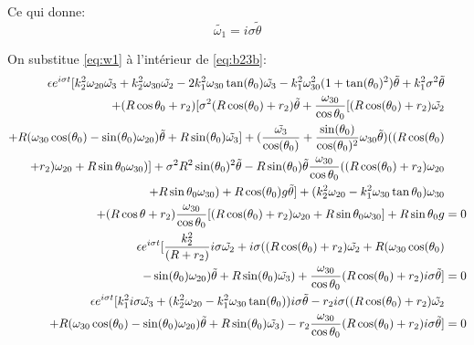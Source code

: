 Ce qui donne:
\begin{equation}
    \tilde{\omega_1}=i \sigma \tilde{\theta}
    \label{eq:w1}
\end{equation}

On substitue \ref{eq:w1} à l'intérieur de \ref{eq:b23b}:
\begin{align}
    \epsilon e^{i \sigma t} [k_2^2 \omega_{20} \tilde{\omega_3}+k_2^2 \omega_{30} \tilde{\omega_2} -2k_1^2\omega_{30} \tan(\theta_0)\tilde{\omega_3}-k_1^2 \omega_{30}^2(1+\tan(\theta_0)^2)\tilde{\theta} +k_1^2 \sigma^2 \tilde{\theta}& \nonumber \\
    +(R\cos{\theta_0}+r_2)[\sigma^2 ( R\cos(\theta_0)+r_2) \tilde{\theta}+\frac{\omega_{30}}{\cos{\theta_0}} [(R\cos(\theta_0)+r_2) \Tilde{\omega_2} & \nonumber \\
    +R(\omega_{30}\cos(\theta_0)-\sin(\theta_0)\omega_{20}) \Tilde{\theta}+R\sin(\theta_0) \Tilde{\omega_3} ] 
    + (\frac{\tilde{\omega_3}}{\cos(\theta_0)}+\frac{\sin(\theta_0)}{\cos(\theta_0)^2}\omega_{30}\tilde{\theta})((R\cos(\theta_0)& \nonumber \\
    +r_2)\omega_{20}+R \sin{\theta_0}\omega_{30})]+ \sigma^2 R^2 \sin(\theta_0)^2  \tilde{\theta}
    -R\sin(\theta_0)\tilde{\theta}\frac{\omega_{30}}{\cos{\theta_0}}  ((R\cos(\theta_0)+r_2)\omega_{20}& \nonumber \\
    +R \sin{\theta_0}\omega_{30})+R\cos(\theta_0)g\tilde{\theta}]+ (k_2^2\omega_{20}-k_1^2\omega_{30} \tan{\theta_0})\omega_{30}& \nonumber \\
    +(R\cos{\theta}+r_2)
     \frac{\omega_{30}}{\cos{\theta_0}}  [(R\cos(\theta_0)+r_2)\omega_{20}+R \sin{\theta_0}\omega_{30}]+ R\sin{\theta_0}g &=0 \nonumber\\ 
    \epsilon e^{i \sigma t}[\frac{k_2^2}{(R+r_2)} i \sigma \Tilde{\omega_2}+i \sigma((R\cos(\theta_0)+r_2) \Tilde{\omega_2} +R(\omega_{30}\cos(\theta_0)& \nonumber \\
    -\sin(\theta_0)\omega_{20}) \Tilde{\theta}+R\sin(\theta_0) \Tilde{\omega_3})+\frac{\omega_{30}}{\cos{\theta_0}} (R\cos(\theta_0)+r_2) i \sigma \tilde{\theta}]  &= 0 \nonumber\\
    \epsilon e^{i \sigma t} [k_1^2 i \sigma\Tilde{\omega_3}+ (k_2^2\omega_{20}-k_1^2\omega_{30} \tan(\theta_0)) i \sigma \tilde{\theta} -r_2 i \sigma ((R\cos(\theta_0)+r_2) \Tilde{\omega_2} & \nonumber \\
    +R(\omega_{30}\cos(\theta_0)-\sin(\theta_0)\omega_{20}) \Tilde{\theta}+R\sin(\theta_0) \Tilde{\omega_3} )- r_2\frac{\omega_{30}}{\cos{\theta_0}} (R\cos(\theta_0)+r_2) i \sigma \tilde{\theta}] &= 0
  \label{eq:b24}
\end{align}
